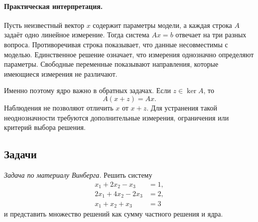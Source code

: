 \paragraph{Практическая интерпретация.}

Пусть неизвестный вектор \(x\) содержит параметры модели, а каждая строка \(A\) задаёт одно линейное измерение. Тогда система \(Ax=b\) отвечает на три разных вопроса. Противоречивая строка показывает, что данные несовместимы с моделью. Единственное решение означает, что измерения однозначно определяют параметры. Свободные переменные показывают направления, которые имеющиеся измерения не различают.

Именно поэтому ядро важно в обратных задачах. Если \(z\in\ker A\), то
\[
A(x+z)=Ax.
\]
Наблюдения не позволяют отличить \(x\) от \(x+z\). Для устранения такой неоднозначности требуются дополнительные измерения, ограничения или критерий выбора решения.

\subsection*{Задачи}

\begin{problem}
\textit{Задача по материалу Винберга.}
Решить систему
\[
\begin{aligned}
x_1+2x_2-x_3&=1,\\
2x_1+4x_2-2x_3&=2,\\
x_1+x_2+x_3&=3
\end{aligned}
\]
и представить множество решений как сумму частного решения и ядра.
\end{problem}

